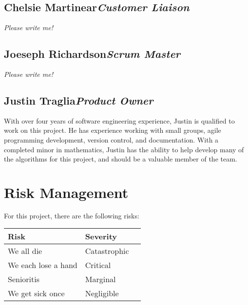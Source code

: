 \documentclass[12pt]{article}
\begin{document}
\subsection{Chelsie Martinear\hfill\textit{Customer Liaison}}

\textit{Please write me!}

\subsection{Joeseph Richardson\hfill\textit{Scrum Master}}

\textit{Please write me!}

\subsection{Justin Traglia\hfill\textit{Product Owner}}

With over four years of software engineering experience, Justin is qualified to
work on this project. He has experience working with small groups, agile
programming development, version control, and documentation. With a completed
minor in mathematics, Justin has the ability to help develop many of the
algorithms for this project, and should be a valuable member of the team.


\section{Risk Management}

For this project, there are the following risks:

%
%

\begin{center}
\begin{tabularx}{\textwidth}{|X|l|l|}
    \hline \textbf{Risk} & \textbf{Severity} \\
    \hline We all die & \color{Red}Catastrophic \\
    \hline We each lose a hand & \color{Orange}Critical \\
    \hline Senioritis & \color{Yellow}Marginal \\
    \hline We get sick once & \color{Green}Negligible \\
    \hline
\end{tabularx}
\end{center}
\end{document}
